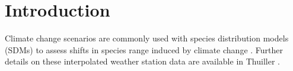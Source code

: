 \documentclass[10pt,letterpaper]{article}
\begin{document}
\section*{Introduction}

Climate change scenarios are commonly used with species distribution
models (SDMs) to assess shifts in species range induced by climate change
\cite{Thuiller2011, Lawler2013}. Further details on these interpolated weather
station data are available in Thuiller \cite{Thuiller2004a}.




\end{document}
